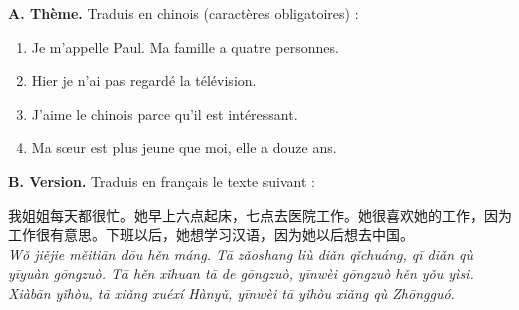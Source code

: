 \documentclass[11pt]{article}
\begin{document}
\begin{exercice}
\textbf{A. Thème.} Traduis en chinois (caractères obligatoires) :
\begin{enumerate}
\item Je m'appelle Paul. Ma famille a quatre personnes.
\item Hier je n'ai pas regardé la télévision.
\item J'aime le chinois parce qu'il est intéressant.
\item Ma sœur est plus jeune que moi, elle a douze ans.
\end{enumerate}
\textbf{B. Version.} Traduis en français le texte suivant :
\begin{textebox}
我姐姐每天都很忙。她早上六点起床，七点去医院工作。她很喜欢她的工作，因为工作很有意思。下班以后，她想学习汉语，因为她以后想去中国。\\
\emph{Wǒ jiějie měitiān dōu hěn máng. Tā zǎoshang liù diǎn qǐchuáng, qī diǎn qù yīyuàn gōngzuò. Tā hěn xǐhuan tā de gōngzuò, yīnwèi gōngzuò hěn yǒu yìsi. Xiàbān yǐhòu, tā xiǎng xuéxí Hànyǔ, yīnwèi tā yǐhòu xiǎng qù Zhōngguó.}
\end{textebox}
\end{exercice}
\end{document}
